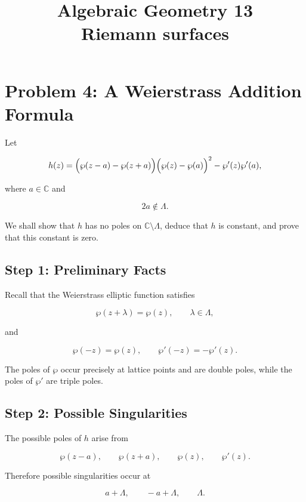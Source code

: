 \documentclass[12pt,a4paper]{article}
\theoremstyle{notespace}
\begin{document}
\title{Algebraic Geometry 13\\
	\large Riemann  surfaces}
\author{}
\date{}

	\maketitle
	

	\setcounter{section}{0}

\tableofcontents

	\clearpage

\section{Problem 4: A Weierstrass Addition Formula}

Let

\[
h(z)
=
\Bigl(\wp(z-a)-\wp(z+a)\Bigr)
\Bigl(\wp(z)-\wp(a)\Bigr)^2
-
\wp'(z)\wp'(a),
\]

where \(a\in\mathbb C\) and

\[
2a\notin\Lambda.
\]

We shall show that \(h\) has no poles on \(\mathbb C\setminus\Lambda\), deduce that \(h\) is constant, and prove that this constant is zero.

\subsection{Step 1: Preliminary Facts}

Recall that the Weierstrass elliptic function satisfies

\[
\wp(z+\lambda)=\wp(z),
\qquad \lambda\in\Lambda,
\]

and

\[
\wp(-z)=\wp(z),
\qquad
\wp'(-z)=-\wp'(z).
\]

The poles of \(\wp\) occur precisely at lattice points and are double poles, while the poles of \(\wp'\) are triple poles.

\subsection{Step 2: Possible Singularities}

The possible poles of \(h\) arise from

\[
\wp(z-a),\qquad \wp(z+a),\qquad \wp(z),\qquad \wp'(z).
\]

Therefore possible singularities occur at

\[
a+\Lambda,
\qquad
-a+\Lambda,
\qquad
\Lambda.
\]
\end{document}
